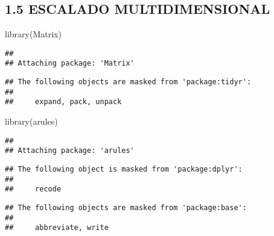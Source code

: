 \documentclass[
]{article}
\newenvironment{Shaded}{\begin{snugshade}}{\end{snugshade}}
\newcommand{\FunctionTok}[1]{\textcolor[rgb]{0.00,0.00,0.00}{#1}}
\newcommand{\NormalTok}[1]{#1}
\begin{document}
\hypertarget{escalado-multidimensional}{%
\subsection{1.5 ESCALADO
MULTIDIMENSIONAL}\label{escalado-multidimensional}}

\begin{Shaded}
\begin{Highlighting}[]
\FunctionTok{library}\NormalTok{(Matrix)}
\end{Highlighting}
\end{Shaded}

\begin{verbatim}
## 
## Attaching package: 'Matrix'
\end{verbatim}

\begin{verbatim}
## The following objects are masked from 'package:tidyr':
## 
##     expand, pack, unpack
\end{verbatim}

\begin{Shaded}
\begin{Highlighting}[]
\FunctionTok{library}\NormalTok{(arules)}
\end{Highlighting}
\end{Shaded}

\begin{verbatim}
## 
## Attaching package: 'arules'
\end{verbatim}

\begin{verbatim}
## The following object is masked from 'package:dplyr':
## 
##     recode
\end{verbatim}

\begin{verbatim}
## The following objects are masked from 'package:base':
## 
##     abbreviate, write
\end{verbatim}
\end{document}
